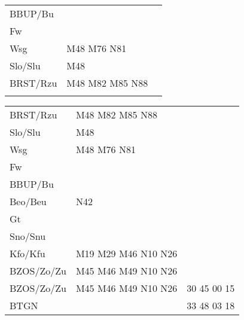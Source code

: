 \begin{tabular}{!{\color{schiefergrau}\vrule width 3pt}*{3}{l!{\color{schiefergrau}\vrule width 3pt}}}
BBUP/Bu      &                                                                   & \\
Fw           &                                                                   & \\
Wsg          & \mbus{} M48 M76 \nbus{} N81                                       & \\
Slo/Slu      & \mbus{} M48                                                       & \\
BRST/Rzu     & \mbus{} M48 M82 M85 \nbus{} N88                                   & \\
\myhline
\end{tabular}
%
\begin{tabular}{!{\color{schiefergrau}\vrule width 3pt}*{3}{l!{\color{schiefergrau}\vrule width 3pt}}}
\hline
{}
 \\
\hline
BRST/Rzu     & \mbus{} M48 M82 M85 \nbus{} N88                                   & \\
Slo/Slu      & \mbus{} M48                                                       & \\
Wsg          & \mbus{} M48 M76 \nbus{} N81                                       & \\
Fw           &                                                                   & \\
BBUP/Bu      &                                                                   & \\
Beo/Beu      & \nusieben{} \nbus{} N42                                           & \\
Gt           &                                                                   & \\
Sno/Snu      & \nudrei{}                                                         & \\
Kfo/Kfu      & \nueins{} \nuzwei{} \nudrei{} \mbus{} M19 M29 M46 \nbus{} N10 N26 & \\
BZOS/Zo/Zu   & \nueins{} \nuzwei{} \mbus{} M45 M46 M49 \nbus{} N10 N26           & \\
\hline
BZOS/Zo/Zu   & \nueins{} \nuzwei{} \mbus{} M45 M46 M49 \nbus{} N10 N26           & 30 45 00 15 \\
BTGN         &                                                                   & 33 48 03 18 \\

\end{tabular}
